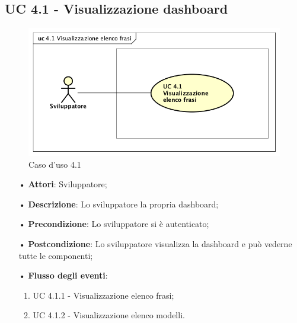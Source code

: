 \subsection{UC 4.1 - Visualizzazione dashboard}
\begin{figure}[H]
\centering
\includegraphics[width=17cm]{img/UC410.png} 
\caption{Caso d'uso 4.1}\label{fig:410}
\end{figure}
\begin{itemize}
\item[•]\textbf{Attori}: Sviluppatore;
\item[•]\textbf{Descrizione}: Lo sviluppatore  la propria {dashboard};
\item[•]\textbf{Precondizione}: Lo sviluppatore si è autenticato;
\item[•]\textbf{Postcondizione}: Lo sviluppatore visualizza la dashboard e può vederne tutte le componenti;
\item[•]\textbf{Flusso degli eventi}:
\begin{enumerate}
\item UC 4.1.1 - Visualizzazione elenco frasi;
\item UC 4.1.2 - Visualizzazione elenco modelli.
\end{enumerate}
\end{itemize}

